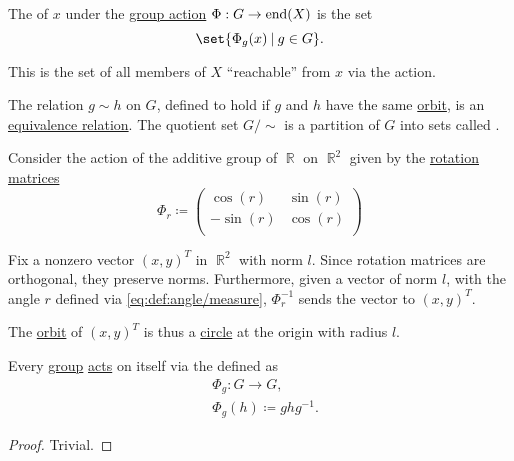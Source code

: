\begin{definition}\label{def:group_action_orbit}
  The  of \( x \) under the \hyperref[def:group_action]{group action} \( \Phi: G \to \operatorname{end}(X) \) is the set
  \begin{equation*}
    \set{ \Phi_g(x) \given g \in G }.
  \end{equation*}

  This is the set of all members of \( X \) \enquote{reachable} from \( x \) via the action.

  The relation \( g \sim h \) on \( G \), defined to hold if \( g \) and \( h \) have the same \hyperref[def:group_action_orbit]{orbit}, is an \hyperref[def:equivalence_relation]{equivalence relation}. The quotient set \( G / {\sim} \) is a partition of \( G \) into sets called .
\end{definition}

\begin{example}\label{ex:plane_rotation_action_orbits}
  Consider the action of the additive group of \( \BbbR \) on \( \BbbR^2 \) given by the \hyperref[def:euclidean_transformation/rotation]{rotation} \hyperref[def:array/matrix]{matrices}
  \begin{equation*}
    \Phi_r \coloneqq \begin{pmatrix}
      \cos(r)  & \sin(r) \\
      -\sin(r) & \cos(r) \\
    \end{pmatrix}
  \end{equation*}

  Fix a nonzero vector \( (x, y)^T \) in \( \BbbR^2 \) with norm \( l \). Since rotation matrices are orthogonal, they preserve norms. Furthermore, given a vector of norm \( l \), with the angle \( r \) defined via \eqref{eq:def:angle/measure}, \( \Phi_r^{-1} \) sends the vector to \( (x, y)^T \).

  The \hyperref[def:group_action_orbit]{orbit} of \( (x, y)^T \) is thus a \hyperref[def:quadratic_plane_curve/ellipse]{circle} at the origin with radius \( l \).
\end{example}

\begin{proposition}\label{thm:group_conjugation_action}
  Every \hyperref[def:group]{group} \hyperref[def:group_action]{acts} on itself via the  defined as
  \begin{equation*}
    \begin{aligned}
      &\Phi_g: G \to G, \\
      &\Phi_g(h) \coloneqq g h g^{-1}.
    \end{aligned}
  \end{equation*}
\end{proposition}
\begin{proof}
  Trivial.
\end{proof}

